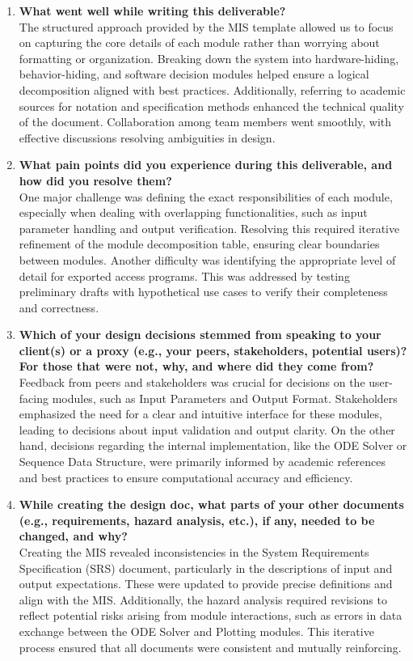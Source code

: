 \documentclass[12pt, titlepage]{article}
\begin{document}
\begin{enumerate}
  \item \textbf{What went well while writing this deliverable?}   \\
  The structured approach provided by the MIS template allowed us to focus on capturing the core details of each module rather than worrying about formatting or organization. Breaking down the system into hardware-hiding, behavior-hiding, and software decision modules helped ensure a logical decomposition aligned with best practices. Additionally, referring to academic sources for notation and specification methods enhanced the technical quality of the document. Collaboration among team members went smoothly, with effective discussions resolving ambiguities in design.

  \item \textbf{What pain points did you experience during this deliverable, and how did you resolve them?}  \\
  One major challenge was defining the exact responsibilities of each module, especially when dealing with overlapping functionalities, such as input parameter handling and output verification. Resolving this required iterative refinement of the module decomposition table, ensuring clear boundaries between modules. Another difficulty was identifying the appropriate level of detail for exported access programs. This was addressed by testing preliminary drafts with hypothetical use cases to verify their completeness and correctness.

  \item \textbf{Which of your design decisions stemmed from speaking to your client(s) or a proxy (e.g., your peers, stakeholders, potential users)? For those that were not, why, and where did they come from?}  \\
  Feedback from peers and stakeholders was crucial for decisions on the user-facing modules, such as Input Parameters and Output Format. Stakeholders emphasized the need for a clear and intuitive interface for these modules, leading to decisions about input validation and output clarity. On the other hand, decisions regarding the internal implementation, like the ODE Solver or Sequence Data Structure, were primarily informed by academic references and best practices to ensure computational accuracy and efficiency.

  \item \textbf{While creating the design doc, what parts of your other documents (e.g., requirements, hazard analysis, etc.), if any, needed to be changed, and why?}  \\
  Creating the MIS revealed inconsistencies in the System Requirements Specification (SRS) document, particularly in the descriptions of input and output expectations. These were updated to provide precise definitions and align with the MIS. Additionally, the hazard analysis required revisions to reflect potential risks arising from module interactions, such as errors in data exchange between the ODE Solver and Plotting modules. This iterative process ensured that all documents were consistent and mutually reinforcing.


\end{enumerate}
\end{document}
